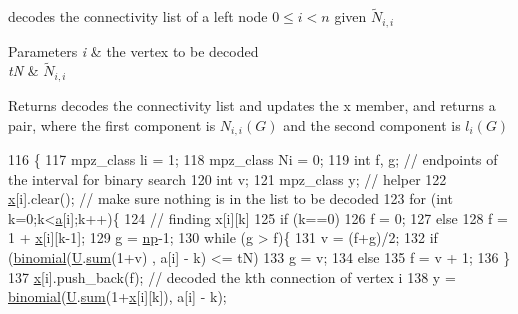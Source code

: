 decodes the connectivity list of a left node $0 \leq i < n$ given $\tilde{N}_{i,i}$ 


\begin{DoxyParams}{Parameters}
{\em i} & the vertex to be decoded \\
\hline
{\em tN} & $\tilde{N}_{i,i}$ \\
\hline
\end{DoxyParams}
\begin{DoxyReturn}{Returns}
decodes the connectivity list and updates the x member, and returns a pair, where the first component is $N_{i,i}(G)$ and the second component is $l_{i}(G)$ 
\end{DoxyReturn}

\begin{DoxyCode}
116 \{
117   mpz\_class li = 1;
118   mpz\_class Ni = 0;
119   \textcolor{keywordtype}{int} f, g; \textcolor{comment}{// endpoints of the interval for binary search}
120   \textcolor{keywordtype}{int} v;
121   mpz\_class y; \textcolor{comment}{// helper}
122   \hyperlink{classb__graph__decoder_a6bba2e67984f9733fc60c40dd4956587}{x}[i].clear(); \textcolor{comment}{// make sure nothing is in the list to be decoded}
123   \textcolor{keywordflow}{for} (\textcolor{keywordtype}{int} k=0;k<\hyperlink{classb__graph__decoder_afcf783e4199fb8f9d6828db08bb12333}{a}[i];k++)\{
124     \textcolor{comment}{// finding x[i][k]}
125     \textcolor{keywordflow}{if} (k==0)
126       f = 0;
127     \textcolor{keywordflow}{else}
128       f = 1 + \hyperlink{classb__graph__decoder_a6bba2e67984f9733fc60c40dd4956587}{x}[i][k-1];
129     g = \hyperlink{classb__graph__decoder_a7eca48cf8793e722d1b29dbdc9fd2dca}{np}-1;
130     \textcolor{keywordflow}{while} (g > f)\{
131       v = (f+g)/2;
132       \textcolor{keywordflow}{if} (\hyperlink{compression__helper_8cpp_a4bc36d358aecc67feee9f87efc041d32}{binomial}(\hyperlink{classb__graph__decoder_ae15e74088bb60a096562a9bdaf380f2c}{U}.\hyperlink{classreverse__fenwick__tree_a672731fd6395b4853430073a099a80e6}{sum}(1+v) , a[i] - k) <= tN)
133         g = v;
134       \textcolor{keywordflow}{else}
135         f = v + 1;
136     \}
137     \hyperlink{classb__graph__decoder_a6bba2e67984f9733fc60c40dd4956587}{x}[i].push\_back(f); \textcolor{comment}{// decoded the kth connection of vertex i}
138     y = \hyperlink{compression__helper_8cpp_a4bc36d358aecc67feee9f87efc041d32}{binomial}(\hyperlink{classb__graph__decoder_ae15e74088bb60a096562a9bdaf380f2c}{U}.\hyperlink{classreverse__fenwick__tree_a672731fd6395b4853430073a099a80e6}{sum}(1+\hyperlink{classb__graph__decoder_a6bba2e67984f9733fc60c40dd4956587}{x}[i][k]), a[i] - k);

\end{DoxyCode}
